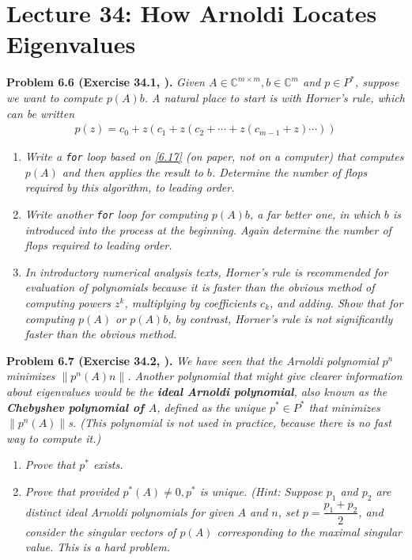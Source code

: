\documentclass[a4paper,oneside]{book}
\numberwithin{equation}{chapter}
\begin{document}
\section{Lecture 34: How Arnoldi Locates Eigenvalues}
\textbf{Problem 6.6 (Exercise 34.1, \cite{1}).} \textit{Given $A\in \mathbb{C}^{m\times m}, b\in \mathbb{C}^m$ and $p\in P^*$, suppose we want to compute $p\left(A\right) b$. A natural place to start is with Horner's rule, which can be written}
\begin{align}
\label{6.17}
p\left( z \right) = {c_0} + z\left( {{c_1} + z\left( {{c_2} +  \cdots  + z\left( {{c_{m - 1}} + z} \right) \cdots } \right)} \right)
\end{align}
\begin{enumerate}
\item \textit{Write a \texttt{for} loop based on \eqref{6.17} (on paper, not on a computer) that computes $p\left(A\right)$ and then applies the result to $b$. Determine the number of flops required by this algorithm, to leading order.}
\item \textit{Write another \texttt{for} loop for computing $p\left(A\right)b$, a far better one, in which $b$ is introduced into the process at the beginning. Again determine the number of flops required to leading order.}
\item \textit{In introductory numerical analysis texts, Horner's rule is recommended for evaluation of polynomials because it is faster than the obvious method of computing powers $z^k$, multiplying by coefficients $c_k$, and adding. Show that for computing $p\left(A\right)$ or $p\left(A\right)b$, by contrast, Horner's rule is not significantly faster than the obvious method.}
\end{enumerate}
\textbf{Problem 6.7 (Exercise 34.2, \cite{1}).} \textit{We have seen that the Arnoldi polynomial $p^n$ minimizes $\left\|p^n\left(A\right)n\right\|$. Another polynomial that might give clearer information about eigenvalues would be the \textbf{ideal Arnoldi polynomial}, also known as the \textbf{Chebyshev polynomial of $A$}, defined as the unique $p^*\in P^*$ that minimizes $\left\|p^n\left(A\right)\right\|$s. (This polynomial is not used in practice, because there is no fast way to compute it.)} 
\begin{enumerate}
\item \textit{Prove that $p^*$ exists.}
\item \textit{Prove that provided $p^*\left(A\right) \ne 0,p^*$ is unique. (Hint: Suppose $p_1$ and $p_2$ are distinct ideal Arnoldi polynomials for given $A$ and $n$, set $p=\dfrac{p_1+p_2}{2}$, and consider the singular vectors of $p\left(A\right)$ corresponding to the maximal singular value. This is a hard problem.}
\end{enumerate}
\end{document}
